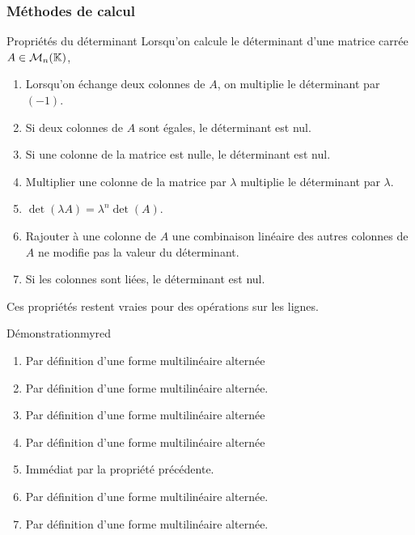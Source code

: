     \subsubsection{Méthodes de calcul}

    \begin{theo}{Propriétés du déterminant}{}
        Lorsqu’on calcule le déterminant d’une matrice carrée $A \in \mathcal{M}_{n}(\mathbb{K})$,
        \begin{enumerate}
            \item Lorsqu’on échange deux colonnes de $A$, on multiplie le déterminant par $(-1)$.
            \item Si deux colonnes de $A$ sont égales, le déterminant est nul.
            \item Si une colonne de la matrice est nulle, le déterminant est nul.
            \item Multiplier une colonne de la matrice par $\lambda$ multiplie le déterminant par $\lambda$.
            \item $\det(\lambda A) = \lambda^n \det(A)$.
            \item Rajouter à une colonne de $A$ une combinaison linéaire des autres colonnes de $A$ ne modifie pas la valeur du déterminant.
            \item Si les colonnes sont liées, le déterminant est nul.
        \end{enumerate}
        Ces propriétés restent vraies pour des opérations sur les lignes.
    \end{theo}

    \begin{demo}{Démonstration}{myred}
        \begin{enumerate}
            \item Par définition d’une forme multilinéaire alternée
            \item Par définition d’une forme multilinéaire alternée.
            \item Par définition d’une forme multilinéaire alternée
            \item Par définition d’une forme multilinéaire alternée
            \item Immédiat par la propriété précédente.
            \item Par définition d’une forme multilinéaire alternée.
            \item Par définition d’une forme multilinéaire alternée.
        \end{enumerate}
    \end{demo}

